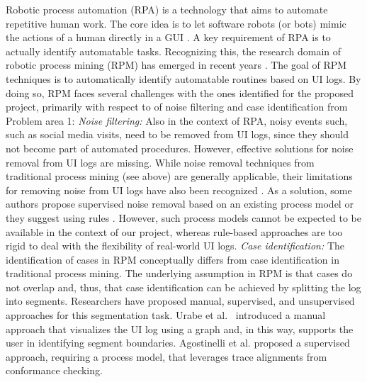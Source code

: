 
 Robotic process automation (RPA) is a technology that aims to automate repetitive human work. The core idea is to let software robots (or bots) mimic the actions of a human directly in a GUI \cite{SYED2020103162}. A key requirement of RPA is to actually identify automatable tasks.  Recognizing this, the research domain of robotic process mining (RPM) has emerged in recent years \cite{leno2021robotic}. The goal of RPM techniques is to automatically identify automatable routines based on UI logs. 
By doing so, RPM faces several challenges with the ones identified for the proposed project, primarily with respect to of noise filtering and case identification from Problem area 1:   
\vspace{0.2em}
\newline%
\noindent \textit{Noise filtering:} 
Also in the context of RPA, noisy events such, such as social media visits, need to be removed from UI logs, since they should not become part of automated procedures. However, effective solutions for noise removal from UI logs are missing. While noise removal techniques from traditional process mining (see above) are generally applicable, their limitations for removing noise from UI logs have also been recognized \cite{leno2021robotic}. 
As a solution, some authors propose supervised noise removal based on an existing process model \cite{agostinelli202111} or they suggest using rules \cite{bosco2019discovering,leno2020identifying}. However, such process models cannot be expected to be available in the context of our project, whereas rule-based approaches are too rigid to deal with the flexibility of real-world UI logs.
\vspace{0.2em}
\newline%
\noindent \textit{Case identification:} The identification of cases in RPM conceptually differs from case identification in traditional process mining. The underlying assumption in RPM is that cases do not overlap and, thus, that case identification can be achieved by splitting the log into segments. 
Researchers have proposed manual, supervised, and unsupervised approaches for this segmentation task. Urabe et al.~\cite{urabe2019visualizing} introduced a manual approach that visualizes the UI log using a graph and, in this way, supports the user in identifying segment boundaries. Agostinelli et al. \cite{agostinelli202111} proposed a supervised approach, requiring a process model, that leverages trace alignments from conformance checking. 
